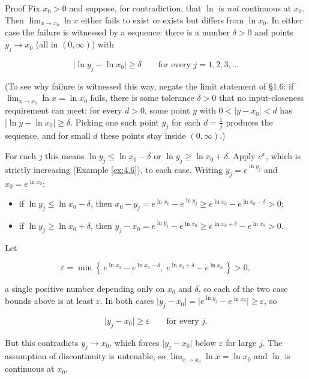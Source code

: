 \documentclass[a4paper,12pt,oneside]{memoir}
\begin{document}
\begin{envproof}{Proof}{}{}
Fix \(x_{0} > 0\) and suppose, for contradiction, that \(\ln\) is \emph{not} continuous at \(x_{0}\). Then \(\lim_{x \to x_{0}} \ln x\) either fails to exist or exists but differs from \(\ln x_{0}\). In either case the failure is witnessed by a sequence: there is a number \(\delta > 0\) and points \(y_{j} \to x_{0}\) (all in \((0, \infty)\)) with

\[ \lvert \ln y_{j} - \ln x_{0} \rvert \ge \delta \qquad \text{for every } j = 1, 2, 3, \dots \]

(To see why failure is witnessed this way, negate the limit statement of §1.6: if \(\lim_{x \to x_{0}} \ln x = \ln x_{0}\) fails, there is some tolerance \(\delta > 0\) that no input-closeness requirement can meet: for every \(d > 0\), some point \(y\) with \(0 < \lvert y - x_{0} \rvert < d\) has \(\lvert \ln y - \ln x_{0} \rvert \ge \delta\). Picking one such point \(y_{j}\) for each \(d = \tfrac{1}{j}\) produces the sequence, and for small \(d\) these points stay inside \((0, \infty)\).)

For each \(j\) this means \(\ln y_{j} \le \ln x_{0} - \delta\) or \(\ln y_{j} \ge \ln x_{0} + \delta\). Apply \(e^{x}\), which is strictly increasing (Example \ref{ex:4.6}), to each case. Writing \(y_{j} = e^{\ln y_{j}}\) and \(x_{0} = e^{\ln x_{0}}\):

\begin{itemize}
  \item if \(\ln y_{j} \le \ln x_{0} - \delta\), then \(x_{0} - y_{j} = e^{\ln x_{0}} - e^{\ln y_{j}} \ge e^{\ln x_{0}} - e^{\ln x_{0} - \delta} > 0\);
  \item if \(\ln y_{j} \ge \ln x_{0} + \delta\), then \(y_{j} - x_{0} = e^{\ln y_{j}} - e^{\ln x_{0}} \ge e^{\ln x_{0} + \delta} - e^{\ln x_{0}} > 0\).
\end{itemize}
Let

\[ \varepsilon = \min\!\left\{\, e^{\ln x_{0}} - e^{\ln x_{0} - \delta}, \; e^{\ln x_{0} + \delta} - e^{\ln x_{0}} \,\right\} > 0, \]

a single positive number depending only on \(x_{0}\) and \(\delta\), so each of the two case bounds above is at least \(\varepsilon\). In both cases \(\lvert y_{j} - x_{0} \rvert = \lvert e^{\ln y_{j}} - e^{\ln x_{0}} \rvert \ge \varepsilon\), so

\[ \lvert y_{j} - x_{0} \rvert \ge \varepsilon \qquad \text{for every } j. \]

But this contradicts \(y_{j} \to x_{0}\), which forces \(\lvert y_{j} - x_{0} \rvert\) below \(\varepsilon\) for large \(j\). The assumption of discontinuity is untenable, so \(\lim_{x \to x_{0}} \ln x = \ln x_{0}\) and \(\ln\) is continuous at \(x_{0}\). \qedmark
\end{envproof}
\end{document}
